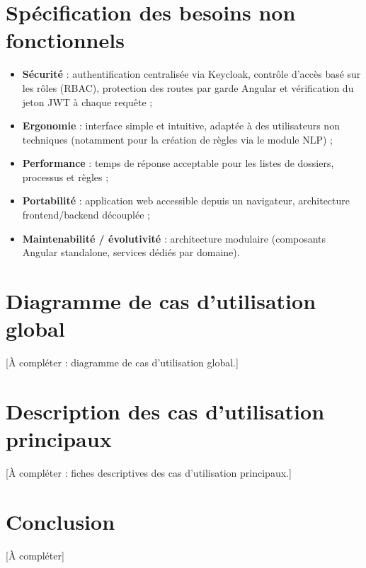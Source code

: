 \section{Sp\'ecification des besoins non fonctionnels}

\begin{itemize}
    \item \textbf{S\'ecurit\'e} : authentification centralis\'ee via
    Keycloak, contr\^ole d'acc\`es bas\'e sur les r\^oles (RBAC), protection
    des routes par garde Angular et v\'erification du jeton JWT \`a chaque
    requ\^ete ;
    \item \textbf{Ergonomie} : interface simple et intuitive, adapt\'ee \`a
    des utilisateurs non techniques (notamment pour la cr\'eation de
    r\`egles via le module NLP) ;
    \item \textbf{Performance} : temps de r\'eponse acceptable pour les
    listes de dossiers, processus et r\`egles ;
    \item \textbf{Portabilit\'e} : application web accessible depuis un
    navigateur, architecture frontend/backend d\'ecoupl\'ee ;
    \item \textbf{Maintenabilit\'e / \'evolutivit\'e} : architecture
    modulaire (composants Angular standalone, services d\'edi\'es par
    domaine).
\end{itemize}

\section{Diagramme de cas d'utilisation global}

[\`A compl\'eter : diagramme de cas d'utilisation global.]


\section{Description des cas d'utilisation principaux}

[\`A compl\'eter : fiches descriptives des cas d'utilisation principaux.]

\section{Conclusion}

[\`A compl\'eter]

\clearpage
